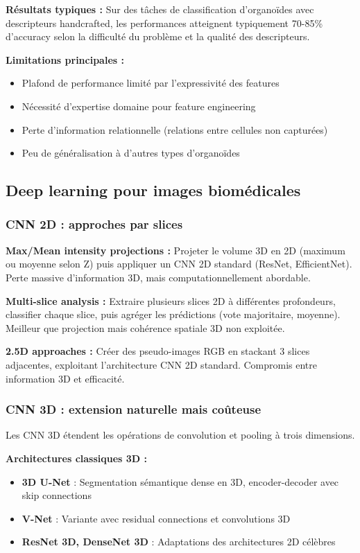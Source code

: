 \textbf{Résultats typiques :}
Sur des tâches de classification d'organoïdes avec descripteurs handcrafted, les performances atteignent typiquement 70-85\% d'accuracy selon la difficulté du problème et la qualité des descripteurs.

\textbf{Limitations principales :}
\begin{itemize}
    \item Plafond de performance limité par l'expressivité des features
    \item Nécessité d'expertise domaine pour feature engineering
    \item Perte d'information relationnelle (relations entre cellules non capturées)
    \item Peu de généralisation à d'autres types d'organoïdes
\end{itemize}

\subsection{Deep learning pour images biomédicales}

\subsubsection{CNN 2D : approches par slices}

\textbf{Max/Mean intensity projections :}
Projeter le volume 3D en 2D (maximum ou moyenne selon Z) puis appliquer un CNN 2D standard (ResNet, EfficientNet). Perte massive d'information 3D, mais computationnellement abordable.

\textbf{Multi-slice analysis :}
Extraire plusieurs slices 2D à différentes profondeurs, classifier chaque slice, puis agréger les prédictions (vote majoritaire, moyenne). Meilleur que projection mais cohérence spatiale 3D non exploitée.

\textbf{2.5D approaches :}
Créer des pseudo-images RGB en stackant 3 slices adjacentes, exploitant l'architecture CNN 2D standard. Compromis entre information 3D et efficacité.

\subsubsection{CNN 3D : extension naturelle mais coûteuse}

Les CNN 3D étendent les opérations de convolution et pooling à trois dimensions.

\textbf{Architectures classiques 3D :}
\begin{itemize}
    \item \textbf{3D U-Net} : Segmentation sémantique dense en 3D, encoder-decoder avec skip connections
    \item \textbf{V-Net} : Variante avec residual connections et convolutions 3D
    \item \textbf{ResNet 3D, DenseNet 3D} : Adaptations des architectures 2D célèbres
\end{itemize}


